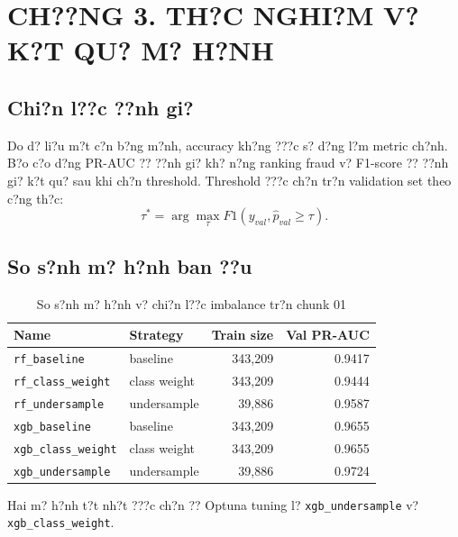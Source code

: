 \cleardoublepage
\section*{CH??NG 3. TH?C NGHI?M V? K?T QU? M? H?NH}
\setcounter{section}{3}
\setcounter{subsection}{0}
\setcounter{figure}{0}
\setcounter{table}{0}

\subsection{Chi?n l??c ??nh gi?}

Do d? li?u m?t c?n b?ng m?nh, accuracy kh?ng ???c s? d?ng l?m metric ch?nh. B?o c?o d?ng PR-AUC ?? ??nh gi? kh? n?ng ranking fraud v? F1-score ?? ??nh gi? k?t qu? sau khi ch?n threshold. Threshold ???c ch?n tr?n validation set theo c?ng th?c:
\begin{equation}
    \tau^* = \arg\max_{\tau} F1(y_{val}, \hat{p}_{val} \ge \tau).
\end{equation}

\subsection{So s?nh m? h?nh ban ??u}

\begin{table}[H]
\centering
\caption{So s?nh m? h?nh v? chi?n l??c imbalance tr?n chunk 01}
\begin{tabular}{llrr}
\toprule
\textbf{Name} & \textbf{Strategy} & \textbf{Train size} & \textbf{Val PR-AUC} \\
\midrule
\texttt{rf\_baseline} & baseline & 343,209 & 0.9417 \\
\texttt{rf\_class\_weight} & class weight & 343,209 & 0.9444 \\
\texttt{rf\_undersample} & undersample & 39,886 & 0.9587 \\
\texttt{xgb\_baseline} & baseline & 343,209 & 0.9655 \\
\texttt{xgb\_class\_weight} & class weight & 343,209 & 0.9655 \\
\texttt{xgb\_undersample} & undersample & 39,886 & 0.9724 \\
\bottomrule
\end{tabular}
\end{table}

Hai m? h?nh t?t nh?t ???c ch?n ?? Optuna tuning l? \texttt{xgb\_undersample} v? \texttt{xgb\_class\_weight}.

